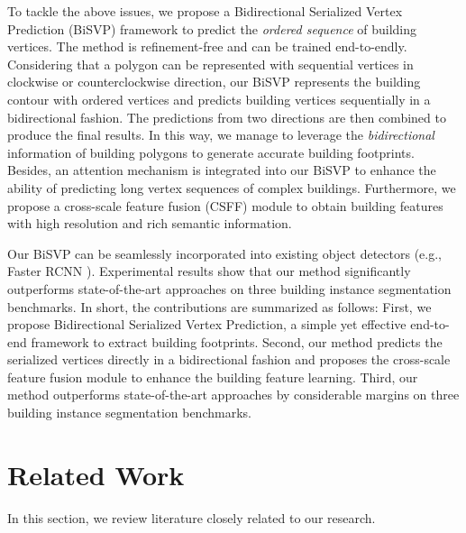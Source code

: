 \documentclass{article}
\begin{document}
To tackle the above issues, we propose a Bidirectional Serialized Vertex Prediction (BiSVP) framework to predict the \textit{ordered sequence} of building vertices. The method is refinement-free and can be trained end-to-endly. Considering that a polygon can be represented with sequential vertices in clockwise or counterclockwise direction, our BiSVP represents the building contour with ordered vertices and predicts building vertices sequentially in a bidirectional fashion. The predictions from two directions are then combined to produce the final results. In this way, we manage to leverage the \textit{bidirectional} information of building polygons to generate accurate building footprints. Besides, an attention mechanism is integrated into our BiSVP to enhance the ability of predicting long vertex sequences of complex buildings. Furthermore, we propose a cross-scale feature fusion (CSFF) module to obtain building features with high resolution and rich semantic information.

Our BiSVP can be seamlessly incorporated into existing object detectors (e.g., Faster RCNN \cite{ren2015fasterrcnn}). Experimental results show that our method significantly outperforms state-of-the-art approaches on three building instance segmentation benchmarks. In short, the contributions are summarized as follows: First, we propose Bidirectional Serialized Vertex Prediction, a simple yet effective end-to-end framework to extract building footprints. Second, our method predicts the serialized vertices directly in a bidirectional fashion and proposes the cross-scale feature fusion module to enhance the building feature learning. Third, our method outperforms state-of-the-art approaches by considerable margins on three building instance segmentation benchmarks.

\vspace{-10pt}
\section{Related Work}
\label{sec:format}

In this section, we review literature closely related to our research.
\vspace{-10pt}
\end{document}
